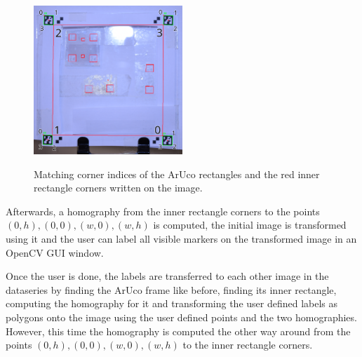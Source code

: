 \documentclass[10pt]{book}
\newenvironment{code}{\captionsetup{type=listing}}{}
\begin{document}
\begin{figure}
  \caption{Matching corner indices of the \ac{ArUco} rectangles and the red inner rectangle corners written on the image.}
  \includegraphics[width=0.5\textwidth]{image/af_markings_3}
  \label{fig:inner_rect_indices}
\end{figure}


                
        

Afterwards, a homography from the inner rectangle corners to the points $(0,h), (0,0), (w,0), (w,h)$ is computed, the initial image is transformed using it and the user can label all visible markers on the transformed image in an \ac{OpenCV} \ac{GUI} window.

Once the user is done, the labels are transferred to each other image in the dataseries by finding the \ac{ArUco} frame like before, finding its inner rectangle, computing the homography for it and transforming the user defined labels as polygons onto the image using the user defined points and the two homographies. However, this time the homography is computed the other way around from the points $(0,h), (0,0), (w,0), (w,h)$ to the inner rectangle corners.
\end{document}
